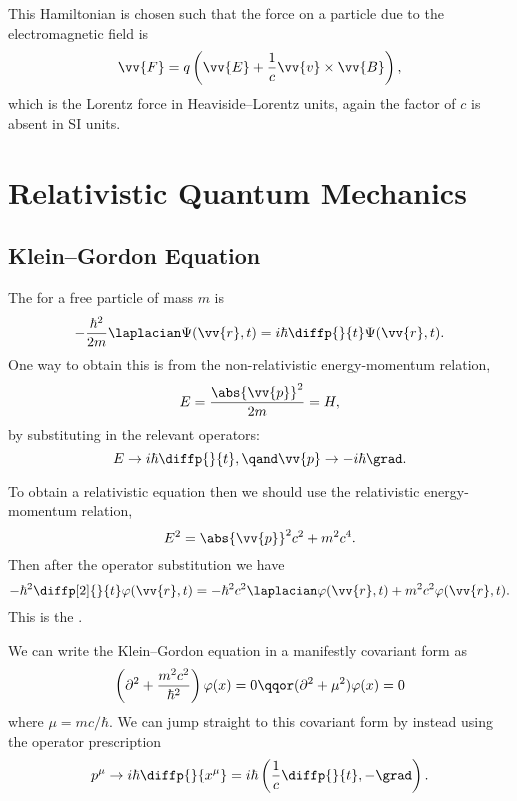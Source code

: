 \documentclass[fleqn]{NotesClass}
\newcommand{\dalembertian}{\partial^2}
\begin{document}
\begin{appendices}
        This Hamiltonian is chosen such that the force on a particle due to the electromagnetic field is
        \begin{equation}
            \vv{F} = q\left( \vv{E} + \frac{1}{c}\vv{v} \times \vv{B} \right),
        \end{equation}
        which is the Lorentz force in Heaviside--Lorentz units, again the factor of \(c\) is absent in SI units.
        
        \section{Relativistic Quantum Mechanics}
        \subsection{Klein--Gordon Equation}
        The  for a free particle of mass \(m\) is
        \begin{equation}
            -\frac{\hbar^2}{2m} \laplacian \Psi(\vv{r}, t) = i\hbar\diffp{}{t}\Psi(\vv{r}, t).
        \end{equation}
        One way to obtain this is from the non-relativistic energy-momentum relation,
        \begin{equation}
            E = \frac{\abs{\vv{p}}^2}{2m} = H,
        \end{equation}
        by substituting in the relevant operators:
        \begin{equation}
            E \to i\hbar\diffp{}{t}, \qand \vv{p} \to -i\hbar\grad.
        \end{equation}
        
        To obtain a relativistic equation then we should use the relativistic energy-momentum relation,
        \begin{equation}
            E^2 = \abs{\vv{p}}^2 c^2 + m^2 c^4.
        \end{equation}
        Then after the operator substitution we have
        \begin{equation}
            -\hbar^2 \diffp[2]{}{t}\varphi(\vv{r}, t) = -\hbar^2c^2\laplacian \varphi(\vv{r}, t) + m^2c^2\varphi(\vv{r}, t).
        \end{equation}
        This is the .
        
        We can write the Klein--Gordon equation in a manifestly covariant form as
        \begin{equation}
            \left( \dalembertian + \frac{m^2c^2}{\hbar^2} \right)\varphi(x) = 0 \qqor (\dalembertian + \mu^2)\varphi(x) = 0
        \end{equation}
        where \(\mu = mc/\hbar\).
        We can jump straight to this covariant form by instead using the operator prescription
        \begin{equation}
            p^\mu \to i\hbar \diffp{}{x^\mu} = i\hbar\left( \frac{1}{c}\diffp{}{t}, -\grad \right).
        \end{equation}
        

\end{appendices}
\end{document}
